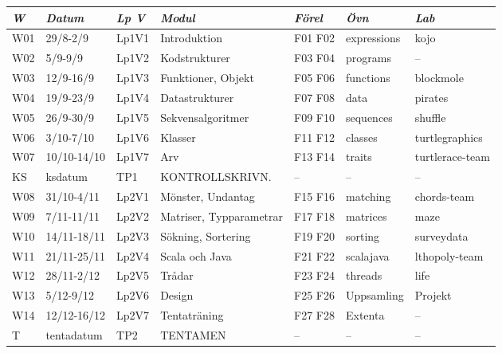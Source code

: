 \begin{tabular}{l|l|l|l|l|l|l}
\textit{W} & \textit{Datum} & \textit{Lp V} & \textit{Modul} & \textit{Förel} & \textit{Övn} & \textit{Lab} \\ \hline \hline
W01 & 29/8-2/9    & Lp1V1 & Introduktion            & F01 F02 & expressions & kojo            \\
W02 & 5/9-9/9     & Lp1V2 & Kodstrukturer           & F03 F04 & programs    & --              \\
W03 & 12/9-16/9   & Lp1V3 & Funktioner, Objekt      & F05 F06 & functions   & blockmole       \\
W04 & 19/9-23/9   & Lp1V4 & Datastrukturer          & F07 F08 & data        & pirates         \\
W05 & 26/9-30/9   & Lp1V5 & Sekvensalgoritmer       & F09 F10 & sequences   & shuffle         \\
W06 & 3/10-7/10   & Lp1V6 & Klasser                 & F11 F12 & classes     & turtlegraphics  \\
W07 & 10/10-14/10 & Lp1V7 & Arv                     & F13 F14 & traits      & turtlerace-team \\
KS  & ksdatum     & TP1   & KONTROLLSKRIVN.         & --      & --          & --              \\
W08 & 31/10-4/11  & Lp2V1 & Mönster, Undantag       & F15 F16 & matching    & chords-team     \\
W09 & 7/11-11/11  & Lp2V2 & Matriser, Typparametrar & F17 F18 & matrices    & maze            \\
W10 & 14/11-18/11 & Lp2V3 & Sökning, Sortering      & F19 F20 & sorting     & surveydata      \\
W11 & 21/11-25/11 & Lp2V4 & Scala och Java          & F21 F22 & scalajava   & lthopoly-team   \\
W12 & 28/11-2/12  & Lp2V5 & Trådar                  & F23 F24 & threads     & life            \\
W13 & 5/12-9/12   & Lp2V6 & Design                  & F25 F26 & Uppsamling  & Projekt         \\
W14 & 12/12-16/12 & Lp2V7 & Tentaträning            & F27 F28 & Extenta     & --              \\
T   & tentadatum  & TP2   & TENTAMEN                & --      & --          & --              \\
\end{tabular}
